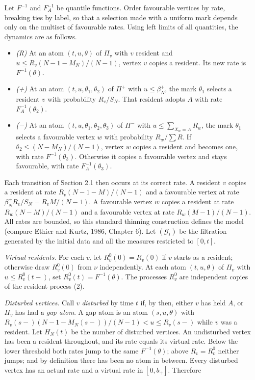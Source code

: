 \documentclass[
  british,
  11pt,
  a4paper,
]{article}
\providecommand{\tightlist}{%
  \setlength{\itemsep}{0pt}\setlength{\parskip}{0pt}}
\begin{document}
Let \(F^{-1}\) and \(F_A^{-1}\) be quantile functions. Order favourable
vertices by rate, breaking ties by label, so that a selection made with
a uniform mark depends only on the multiset of favourable rates. Using
left limits of all quantities, the dynamics are as follows.

\begin{itemize}
\tightlist
\item
  \emph{(R)} At an atom \((t,u,\theta)\) of \(\Pi_v\) with \(v\)
  resident and \(u\le R_v(N-1-M_N)/(N-1)\), vertex \(v\) copies a
  resident. Its new rate is \(F^{-1}(\theta)\).
\item
  \emph{(+)} At an atom \((t,u,\theta_1,\theta_2)\) of \(\Pi^+\) with
  \(u\le\beta_N^+\), the mark \(\theta_1\) selects a resident \(v\) with
  probability \(R_v/S_N\). That resident adopts \(A\) with rate
  \(F_A^{-1}(\theta_2)\).
\item
  \emph{(−)} At an atom \((t,u,\theta_1,\theta_2,\theta_3)\) of
  \(\Pi^-\) with \(u\le\sum_{X_w=A}R_w\), the mark \(\theta_1\) selects
  a favourable vertex \(w\) with probability \(R_w/\sum R\). If
  \(\theta_2\le(N-M_N)/(N-1)\), vertex \(w\) copies a resident and
  becomes one, with rate \(F^{-1}(\theta_3)\). Otherwise it copies a
  favourable vertex and stays favourable, with rate
  \(F_A^{-1}(\theta_3)\).
\end{itemize}

Each transition of Section 2.1 then occurs at its correct rate. A
resident \(v\) copies a resident at rate \(R_v(N-1-M)/(N-1)\) and a
favourable vertex at rate \(\beta_N^+R_v/S_N=R_vM/(N-1)\). A favourable
vertex \(w\) copies a resident at rate \(R_w(N-M)/(N-1)\) and a
favourable vertex at rate \(R_w(M-1)/(N-1)\). All rates are bounded, so
this standard thinning construction defines the model (compare Ethier
and Kurtz, 1986, Chapter 6). Let \((\mathcal G_t)\) be the filtration
generated by the initial data and all the measures restricted to
\([0,t]\).

\emph{Virtual residents.} For each \(v\), let \(R^0_v(0)=R_v(0)\) if
\(v\) starts as a resident; otherwise draw \(R^0_v(0)\) from \(\nu\)
independently. At each atom \((t,u,\theta)\) of \(\Pi_v\) with
\(u\le R^0_v(t-)\), set \(R^0_v(t)=F^{-1}(\theta)\). The processes
\(R^0_v\) are independent copies of the resident process (2).

\emph{Disturbed vertices.} Call \(v\) \emph{disturbed} by time \(t\) if,
by then, either \(v\) has held \(A\), or \(\Pi_v\) has had a \emph{gap
atom}. A gap atom is an atom \((s,u,\theta)\) with
\(R_v(s-)(N-1-M_N(s-))/(N-1)<u\le R_v(s-)\) while \(v\) was a resident.
Let \(H_N(t)\) be the number of disturbed vertices. An undisturbed
vertex has been a resident throughout, and its rate equals its virtual
rate. Below the lower threshold both rates jump to the same
\(F^{-1}(\theta)\); above \(R_v=R_v^0\) neither jumps; and by definition
there has been no atom in between. Every disturbed vertex has an actual
rate and a virtual rate in \([0,b_+]\). Therefore
\end{document}
